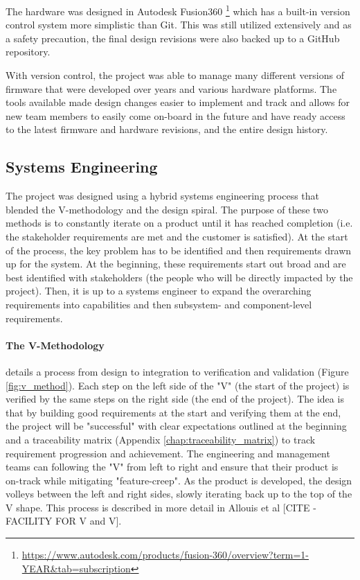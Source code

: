 The hardware was designed in Autodesk Fusion360 \footnote[8]{\url{https://www.autodesk.com/products/fusion-360/overview?term=1-YEAR&tab=subscription}} which has a built-in version control system more simplistic than Git.
This was still utilized extensively and as a safety precaution, the final design revisions were also backed up to a GitHub repository.

With version control, the project was able to manage many different versions of firmware that were developed over years and various hardware platforms.
The tools available made design changes easier to implement and track and allows for new team members to easily come on-board in the future and have ready access to the latest firmware and hardware revisions, and the entire design history.

\subsection{Systems Engineering}
The project was designed using a hybrid systems engineering process that blended the V-methodology and the design spiral.
The purpose of these two methods is to constantly iterate on a product until it has reached completion (i.e. the stakeholder requirements are met and the customer is satisfied).
At the start of the process, the key problem has to be identified and then requirements drawn up for the system.
At the beginning, these requirements start out broad and are best identified with stakeholders (the people who will be directly impacted by the project).
Then, it is up to a systems engineer to expand the overarching requirements into capabilities and then subsystem- and component-level requirements.

\paragraph*{The V-Methodology} details a process from design to integration to verification and validation (Figure \ref{fig:v_method}).
Each step on the left side of the "V" (the start of the project) is verified by the same steps on the right side (the end of the project).
The idea is that by building good requirements at the start and verifying them at the end, the project will be "successful" with clear expectations outlined at the beginning and a traceability matrix (Appendix \ref{chap:traceability_matrix}) to track requirement progression and achievement.
The engineering and management teams can following the "V" from left to right and ensure that their product is on-track while mitigating "feature-creep".
As the product is developed, the design volleys between the left and right sides, slowly iterating back up to the top of the V shape.
This process is described in more detail in Allouis et al [CITE - FACILITY FOR V and V].

